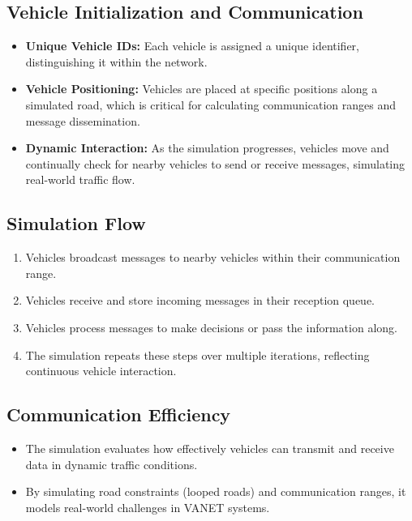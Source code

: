 \subsection{Vehicle Initialization and Communication}
\begin{itemize}
    \item \textbf{Unique Vehicle IDs:} Each vehicle is assigned a unique identifier, distinguishing it within the network.
    \item \textbf{Vehicle Positioning:} Vehicles are placed at specific positions along a simulated road, which is critical for calculating communication ranges and message dissemination.
    \item \textbf{Dynamic Interaction:} As the simulation progresses, vehicles move and continually check for nearby vehicles to send or receive messages, simulating real-world traffic flow.
\end{itemize}

\subsection{Simulation Flow}
\begin{enumerate}
    \item Vehicles broadcast messages to nearby vehicles within their communication range.
    \item Vehicles receive and store incoming messages in their reception queue.
    \item Vehicles process messages to make decisions or pass the information along.
    \item The simulation repeats these steps over multiple iterations, reflecting continuous vehicle interaction.
\end{enumerate}

\subsection{Communication Efficiency}
\begin{itemize}
    \item The simulation evaluates how effectively vehicles can transmit and receive data in dynamic traffic conditions.
    \item By simulating road constraints (looped roads) and communication ranges, it models real-world challenges in VANET systems.
\end{itemize}


